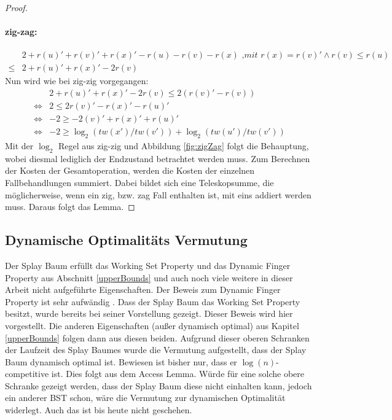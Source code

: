 \documentclass[a4paper,12pt]{article}
\begin{document}
\begin{proof}
	\paragraph{zig-zag:} 
	\begin{align*}
	&2 + r\left(u\right)' +r\left(v\right)' +r\left(x\right)' - r\left(u\right)- r\left(v\right)- r\left(x\right) \textit{ ,mit $r\left(x\right) =  r\left(v\right)' \land r\left(v\right) \leq  r\left(u\right)$} \\
	\leq& 2 + r\left(u\right)' +r\left(x\right)' - 2 r\left(v\right)
	\end{align*}
	Nun wird wie bei zig-zig vorgegangen:
	\begin{align*}
	&  2 + r\left(u\right)' +r\left(x\right)' - 2 r\left(v\right) \leq  2\left(r\left(v\right)'- r\left(v\right)\right)\\
	\Leftrightarrow &2 \leq 2r\left(v\right)' -  r\left(x\right)' - r\left(u\right)'\\
	\Leftrightarrow &-2 \geq -2\left(v\right)' +  r\left(x\right)' + r\left(u\right)'\\
	\Leftrightarrow & -2 \geq \log_2\left(\mathit{tw}\left(x'\right) / \mathit{tw}\left(v'\right)\right) + \log_2\left(\mathit{tw}\left(u'\right) / \mathit{tw}\left(v'\right)\right)
	\end{align*}
	Mit der $\log_2$ Regel aus zig-zig und Abbildung \ref{fig:zigZag} folgt die Behauptung, wobei diesmal lediglich der Endzustand betrachtet werden muss.
	Zum Berechnen der Kosten der Gesamtoperation, werden die Kosten der einzelnen Fallbehandlungen summiert. Dabei bildet sich eine Teleskopsumme, die möglicherweise, wenn ein  zig, bzw. zag Fall enthalten ist, mit eins addiert werden muss. Daraus folgt das Lemma.
\end{proof}

\subsection{Dynamische Optimalitäts Vermutung}
Der Splay Baum erfüllt das Working Set Property und das Dynamic Finger Property aus Abschnitt \ref{upperBounds} und auch noch viele weitere in dieser Arbeit nicht aufgeführte Eigenschaften. Der Beweis zum Dynamic Finger Property ist sehr aufwändig \cite{dynFinger}. Dass der Splay Baum das Working Set Property besitzt, wurde bereits bei seiner Vorstellung gezeigt\cite{splay}. Dieser Beweis wird hier vorgestellt. Die anderen Eigenschaften (außer dynamisch optimal) aus Kapitel \ref{upperBounds} folgen dann aus diesen beiden. Aufgrund dieser oberen Schranken der Laufzeit des Splay Baumes wurde die Vermutung aufgestellt, dass der Splay Baum dynamisch optimal ist. Bewiesen ist bisher nur, dass er $\log \left(n\right)$-competitive ist. Dies folgt aus dem Access Lemma. Würde für eine solche obere Schranke gezeigt werden, dass der Splay Baum diese nicht einhalten kann, jedoch ein anderer BST schon, wäre die Vermutung zur dynamischen Optimalität widerlegt. Auch das ist bis heute nicht geschehen. \\
\end{document}
